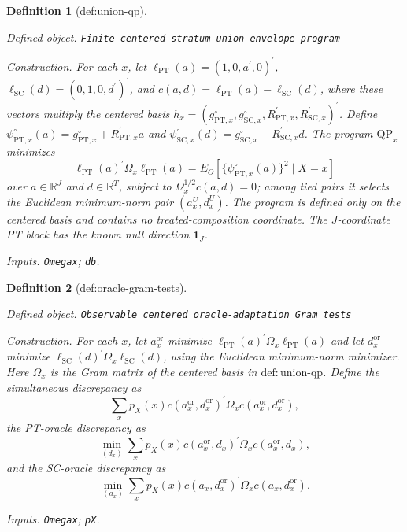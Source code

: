 \documentclass{article}
\newtheorem{definition}{Definition}
\begin{document}
\begin{definition}[def:union-qp]\label{def:union-qp}
\par\smallskip\noindent\emph{Defined object.} \texttt{Finite centered stratum union-\allowbreak{}envelope program}
\par\smallskip\noindent\emph{Construction.} For each \(x\), let \(\ell_{\mathrm{PT}}(a)=(1,0,a^{\prime},0)^{\prime}\), \(\ell_{\mathrm{SC}}(d)=(0,1,0,d^{\prime})^{\prime}\), and \(c(a,d)=\ell_{\mathrm{PT}}(a)-\ell_{\mathrm{SC}}(d)\), where these vectors multiply the centered basis \(h_x=(g^{\circ}_{\mathrm{PT},x},g^{\circ}_{\mathrm{SC},x},R_{\mathrm{PT},x}^{\prime},R_{\mathrm{SC},x}^{\prime})^{\prime}\). Define \(\psi^{\circ}_{\mathrm{PT},x}(a)=g^{\circ}_{\mathrm{PT},x}+R_{\mathrm{PT},x}^{\prime}a\) and \(\psi^{\circ}_{\mathrm{SC},x}(d)=g^{\circ}_{\mathrm{SC},x}+R_{\mathrm{SC},x}^{\prime}d\). The program \(\mathrm{QP}_x\) minimizes
\[
 \ell_{\mathrm{PT}}(a)^{\prime}\Omega_x\ell_{\mathrm{PT}}(a)
 =E_O[\{\psi^{\circ}_{\mathrm{PT},x}(a)\}^2\mid X=x]
\]
over \(a\in\mathbb R^J\) and \(d\in\mathbb R^T\), subject to \(\Omega_x^{1/2}c(a,d)=0\); among tied pairs it selects the Euclidean minimum-norm pair \((a_x^U,d_x^U)\). The program is defined only on the centered basis and contains no treated-composition coordinate. The \(J\)-coordinate PT block has the known null direction \(\mathbf 1_J\).
\par\smallskip\noindent\emph{Inputs.} \texttt{Omegax}; \texttt{db}.
\end{definition}

\begin{definition}[def:oracle-gram-tests]\label{def:oracle-gram-tests}
\par\smallskip\noindent\emph{Defined object.} \texttt{Observable centered oracle-\allowbreak{}adaptation Gram tests}
\par\smallskip\noindent\emph{Construction.} For each \(x\), let \(a_x^{\mathrm{or}}\) minimize \(\ell_{\mathrm{PT}}(a)^{\prime}\Omega_x\ell_{\mathrm{PT}}(a)\) and let \(d_x^{\mathrm{or}}\) minimize \(\ell_{\mathrm{SC}}(d)^{\prime}\Omega_x\ell_{\mathrm{SC}}(d)\), using the Euclidean minimum-norm minimizer. Here \(\Omega_x\) is the Gram matrix of the centered basis in \(\mathrm{def{:}union\text{-}qp}\). Define the simultaneous discrepancy as
\[
 \sum_xp_X(x)c(a_x^{\mathrm{or}},d_x^{\mathrm{or}})^{\prime}\Omega_xc(a_x^{\mathrm{or}},d_x^{\mathrm{or}}),
\]
the PT-oracle discrepancy as
\[
 \min_{(d_x)}\sum_xp_X(x)c(a_x^{\mathrm{or}},d_x)^{\prime}\Omega_xc(a_x^{\mathrm{or}},d_x),
\]
and the SC-oracle discrepancy as
\[
 \min_{(a_x)}\sum_xp_X(x)c(a_x,d_x^{\mathrm{or}})^{\prime}\Omega_xc(a_x,d_x^{\mathrm{or}}).
\]
\par\smallskip\noindent\emph{Inputs.} \texttt{Omegax}; \texttt{pX}.
\end{definition}
\end{document}
